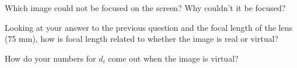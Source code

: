 \documentclass[10pt]{exam}
\begin{document}
\begin{questions}
\vs

\question
Which image could not be focused on the screen? Why couldn’t it be focused?

\vs

\question
Looking at your answer to the previous question and the focal length of the lens (75 mm), how is focal length related to whether the image is real or virtual?

\vs

\question
How do your numbers for $d_i$ come out when the image is virtual?

\vs

\end{questions}
\end{document}
